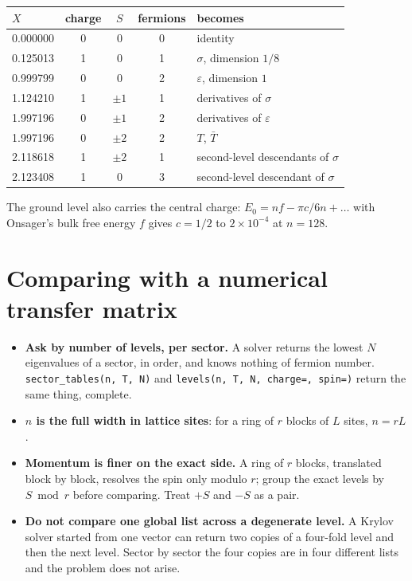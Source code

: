 \documentclass[11pt]{article}
\newcommand\code[1]{\texttt{#1}}
\begin{document}
\begin{center}\begin{tabular}{lcccl}
\toprule
$X$ & charge & $S$ & fermions & becomes \\
\midrule
0.000000 & 0 & 0 & 0 & identity \\
0.125013 & 1 & 0 & 1 & $\sigma$, dimension $1/8$ \\
0.999799 & 0 & 0 & 2 & $\varepsilon$, dimension $1$ \\
1.124210 & 1 & $\pm 1$ & 1 & derivatives of $\sigma$ \\
1.997196 & 0 & $\pm 1$ & 2 & derivatives of $\varepsilon$ \\
1.997196 & 0 & $\pm 2$ & 2 & $T$, $\bar T$ \\
2.118618 & 1 & $\pm 2$ & 1 & second-level descendants of $\sigma$ \\
2.123408 & 1 & 0 & 3 & second-level descendant of $\sigma$ \\
\bottomrule
\end{tabular}\end{center}

The ground level also carries the central charge: $E_0 = n f - \pi c / 6n + \dots$ with Onsager's
bulk free energy $f$ gives $c = 1/2$ to $2 \times 10^{-4}$ at $n = 128$.

\section{Comparing with a numerical transfer matrix}

\begin{itemize}
\item \textbf{Ask by number of levels, per sector.}  A solver returns the lowest $N$ eigenvalues
  of a sector, in order, and knows nothing of fermion number.  \code{sector\_tables(n, T, N)} and
  \code{levels(n, T, N, charge=, spin=)} return the same thing, complete.
\item \textbf{$n$ is the full width in lattice sites}: for a ring of $r$ blocks of $L$ sites,
  $n = rL$.
\item \textbf{Momentum is finer on the exact side.}  A ring of $r$ blocks, translated block by
  block, resolves the spin only modulo $r$; group the exact levels by $S \bmod r$ before
  comparing.  Treat $+S$ and $-S$ as a pair.
\item \textbf{Do not compare one global list across a degenerate level.}  A Krylov solver started
  from one vector can return two copies of a four-fold level and then the next level.  Sector by
  sector the four copies are in four different lists and the problem does not arise.
\end{itemize}
\end{document}
